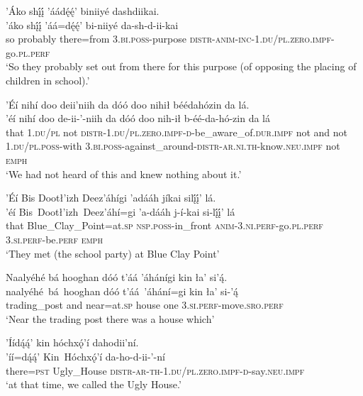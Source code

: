 \ea\label{ex:text1-22-3}
’Áko shį́į́ ’áádę́ę́’ biniiyé dashdiikai.\\
\gll ’áko	shį́į́	’áá=dę́ę́’	bi-niiyé	da-sh-d-ii-kai\\
     so	probably	there=from	3.\textsc{bi}.\textsc{poss}-purpose	\textsc{distr}-\textsc{anim}-\textsc{inc}-1.\textsc{du}/\textsc{pl}.\textsc{zero}.\textsc{impf}-go.\textsc{pl}.\textsc{perf}\\
\glt `So they probably set out from there for this purpose (of opposing the placing of children in school).'
\z

\ea\label{ex:text1-22-4}
’Éí nihí doo deii’niih da dóó doo nihił béédahózin da lá.\\
\gll ’éí	nihí	doo	de-ii-’-niih	da	dóó	doo	nih-ił	b-éé-da-hó-zin	da	lá\\
     that	1.\textsc{du}/\textsc{pl}	not	\textsc{distr}-1.\textsc{du}/\textsc{pl}.\textsc{zero}.\textsc{impf}-\textsc{d}-be\_aware\_of.\textsc{dur}.\textsc{impf}	not	and	not	1.\textsc{du}/\textsc{pl}.\textsc{poss}-with	3.\textsc{bi}.\textsc{poss}-against\_around-\textsc{distr}-\textsc{ar}.\textsc{ni}.\textsc{th}-know.\textsc{neu}.\textsc{impf}	not	\textsc{emph}\\
\glt `We had not heard of this and knew nothing about it.'
\z

\ea\label{ex:text1-22-5}
’Éí Bis Dootł’izh Deez’áhígi ’adááh jíkai silį́į́’ lá.\\
\gll ’éí	Bis~Dootł’izh~{Deez’áhí=gi}	’a-dááh	j-í-kai	si-lį́į́’	lá\\
     that	Blue\_Clay\_Point=at.\textsc{sp}	\textsc{nsp}.\textsc{poss}-in\_front	\textsc{anim}-3.\textsc{ni}.\textsc{perf}-go.\textsc{pl}.\textsc{perf}	3.\textsc{si}.\textsc{perf}-be.\textsc{perf}	\textsc{emph}\\
\glt `They met (the school party) at Blue Clay Point'
\z

\ea\label{ex:text1-22-6}
Naalyéhé bá hooghan dóó t’áá ’áhánígi kin ła’ si’ą́.\\
\gll naalyéhé~bá~{hooghan}	dóó	t’áá~{’áhání=gi}	kin	ła’	si-’ą́\\
     trading\_post	and	near=at.\textsc{sp}	house	one	3.\textsc{si}.\textsc{perf}-move.\textsc{sro}.\textsc{perf}\\
\glt `Near the trading post there was a house which'
\z

\newpage
\ea\label{ex:text1-22-7}
’Íídą́ą́’ kin hóchxǫ́’í dahodii’ní.\\
\gll ’íí=dą́ą́’	Kin~{Hóchxǫ́’í}	da-ho-d-ii-’-ní\\
     there=\textsc{pst}	Ugly\_House	\textsc{distr}-\textsc{ar}-\textsc{th}-1.\textsc{du}/\textsc{pl}.\textsc{zero}.\textsc{impf}-\textsc{d}-say.\textsc{neu}.\textsc{impf}\\
\glt `at that time, we called the Ugly House.'
\z

